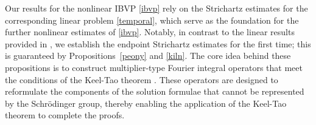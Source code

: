 \documentclass[preprint,compress,12pt]{elsarticle}
\newtheorem{theorem}{Theorem}[section]
\newtheorem{remark}[theorem]{Remark}
\numberwithin{equation}{section}
\begin{document}



Our results for the nonlinear IBVP \eqref{ibvp} rely on the Strichartz estimates for the corresponding linear problem \eqref{temporal},  which serve as the foundation for the further nonlinear estimates of \eqref{ibvp}.   Notably, in contrast to the linear results provided in \cite{facilitate}, we establish the endpoint Strichartz estimates for the first time; this is guaranteed by Propositions~\ref{peony} and \ref{kiln}. The core idea behind these propositions is to  construct multiplier-type Fourier integral operators  that meet the conditions of the  Keel-Tao theorem \cite{tao}. These operators are designed to reformulate the components of the solution formulae that cannot be represented by the Schr\"{o}dinger group, thereby enabling the application of the  Keel-Tao theorem \cite{tao} to complete the proofs.
\end{document}
